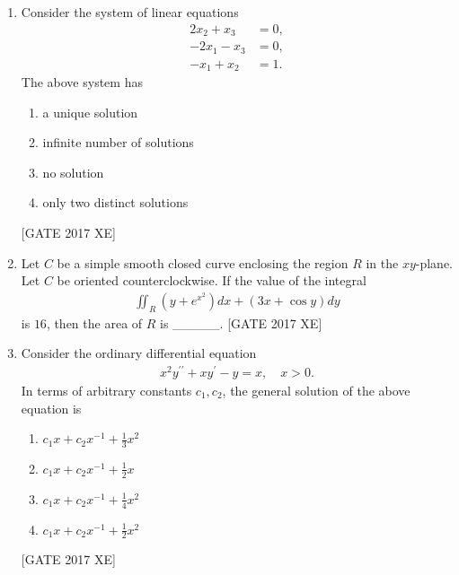 \documentclass[journal,12pt,onecolumn]{IEEEtran}
\theoremstyle{remark}
\begin{document}
\begin{enumerate}
    \item Consider the system of linear equations
    \begin{align}
        2x_2 + x_3 &= 0, \\
        -2x_1 - x_3 &= 0, \\
        -x_1 + x_2 &= 1.
    \end{align}
    The above system has
    \begin{multicols}{2}
    \begin{enumerate}
        \item a unique solution
        \item infinite number of solutions
        \item no solution
        \item only two distinct solutions
    \end{enumerate}
    \end{multicols}
    \hfill [GATE 2017 XE]

    \item Let $C$ be a simple smooth closed curve enclosing the region $R$ in the $xy$-plane.  
    Let $C$ be oriented counterclockwise. If the value of the integral
    \begin{align}
        \iint_{R} \left( y + e^{x^2}\right) dx + \left(3x + \cos y\right) dy
    \end{align}
    is $16$, then the area of $R$ is \_\_\_\_\_.
    \hfill [GATE 2017 XE]
\item Consider the ordinary differential equation
    \begin{align}
        x^2 y^{\prime\prime} + x y^{\prime} - y = x, \quad x > 0.
    \end{align}
    In terms of arbitrary constants $c_1, c_2$, the general solution of the above equation is
    \begin{multicols}{2}
    \begin{enumerate}
        \item $c_1 x + c_2 x^{-1} + \tfrac{1}{3}x^2$
        \item $c_1 x + c_2 x^{-1} + \tfrac{1}{2}x$
        \item $c_1 x + c_2 x^{-1} + \tfrac{1}{4}x^2$
        \item $c_1 x + c_2 x^{-1} + \tfrac{1}{2}x^2$
    \end{enumerate}
    \end{multicols}
    \hfill [GATE 2017 XE]


\end{enumerate}
\end{document}
